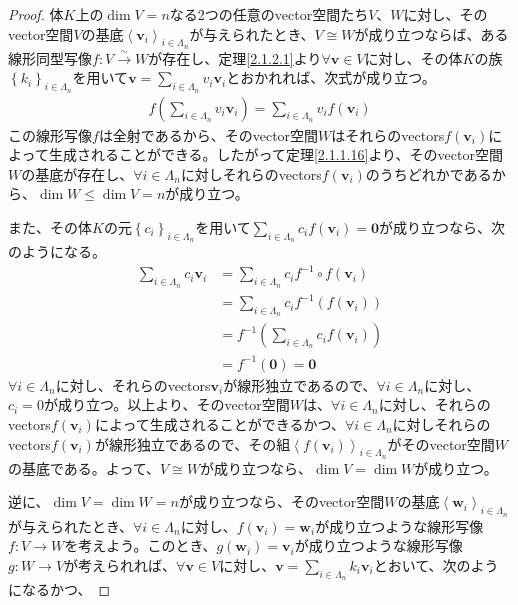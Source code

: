 \documentclass[dvipdfmx]{jsarticle}
\begin{document}
\begin{proof}
体$K$上の$\dim V = n$なる2つの任意のvector空間たち$V$、$W$に対し、そのvector空間$V$の基底$\left\langle \mathbf{v}_{i} \right\rangle_{i \in \varLambda_{n}}$が与えられたとき、$V \cong W$が成り立つならば、ある線形同型写像$f:V\overset{\sim}{\rightarrow}W$が存在し、定理\ref{2.1.2.1}より$\forall\mathbf{v} \in V$に対し、その体$K$の族$\left\{ k_{i} \right\}_{i \in \varLambda_{n}}$を用いて$\mathbf{v} = \sum_{i \in \varLambda_{n}} {v_{i}\mathbf{v}_{i}}$とおかれれば、次式が成り立つ。
\begin{align*}
f\left( \sum_{i \in \varLambda_{n}} {v_{i}\mathbf{v}_{i}} \right) = \sum_{i \in \varLambda_{n}} {v_{i}f\left( \mathbf{v}_{i} \right)}
\end{align*}
この線形写像$f$は全射であるから、そのvector空間$W$はそれらのvectors$f\left( \mathbf{v}_{i} \right)$によって生成されることができる。したがって定理\ref{2.1.1.16}より、そのvector空間$W$の基底が存在し、$\forall i \in \varLambda_{n}$に対しそれらのvectors$f\left( \mathbf{v}_{i} \right)$のうちどれかであるから、$\dim W \leq \dim V = n$が成り立つ。\par
また、その体$K$の元$\left\{ c_{i} \right\}_{i \in \varLambda_{n}}$を用いて$\sum_{i \in \varLambda_{n}} {c_{i}f\left( \mathbf{v}_{i} \right)} = \mathbf{0}$が成り立つなら、次のようになる。
\begin{align*}
\sum_{i \in \varLambda_{n}} {c_{i}\mathbf{v}_{i}} &= \sum_{i \in \varLambda_{n}} {c_{i}f^{- 1} \circ f\left( \mathbf{v}_{i} \right)}\\
&= \sum_{i \in \varLambda_{n}} {c_{i}f^{- 1}\left( f\left( \mathbf{v}_{i} \right) \right)}\\
&= f^{- 1}\left( \sum_{i \in \varLambda_{n}} {c_{i}f\left( \mathbf{v}_{i} \right)} \right)\\
&= f^{- 1}\left( \mathbf{0} \right) = \mathbf{0}
\end{align*}
$\forall i \in \varLambda_{n}$に対し、それらのvectors$\mathbf{v}_{i}$が線形独立であるので、$\forall i \in \varLambda_{n}$に対し、$c_{i} = 0$が成り立つ。以上より、そのvector空間$W$は、$\forall i \in \varLambda_{n}$に対し、それらのvectors$f\left( \mathbf{v}_{i} \right)$によって生成されることができるかつ、$\forall i \in \varLambda_{n}$に対しそれらのvectors$f\left( \mathbf{v}_{i} \right)$が線形独立であるので、その組$\left\langle f\left( \mathbf{v}_{i} \right) \right\rangle_{i \in \varLambda_{n}}$がそのvector空間$W$の基底である。よって、$V \cong W$が成り立つなら、$\dim V = \dim W$が成り立つ。\par
逆に、$\dim V = \dim W = n$が成り立つなら、そのvector空間$W$の基底$\left\langle \mathbf{w}_{i} \right\rangle_{i \in \varLambda_{n}}$が与えられたとき、$\forall i \in \varLambda_{n}$に対し、$f\left( \mathbf{v}_{i} \right) = \mathbf{w}_{i}$が成り立つような線形写像$f:V \rightarrow W$を考えよう。このとき、$g\left( \mathbf{w}_{i} \right) = \mathbf{v}_{i}$が成り立つような線形写像$g:W \rightarrow V$が考えられれば、$\forall\mathbf{v} \in V$に対し、$\mathbf{v} = \sum_{i \in \varLambda_{n}} {k_{i}\mathbf{v}_{i}}$とおいて、次のようになるかつ、

\end{proof}
\end{document}
